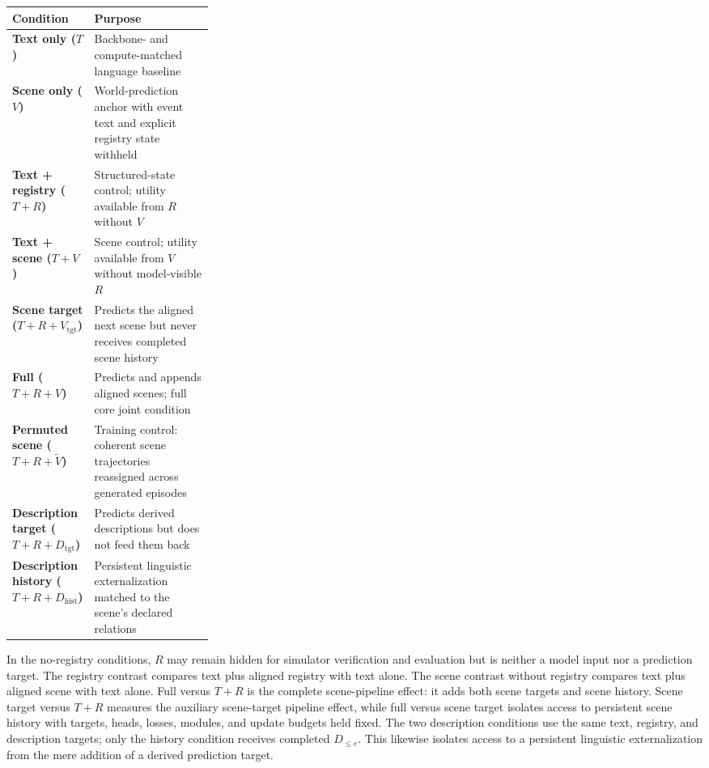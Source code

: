\documentclass[11pt]{article}
\begin{document}
\begin{center}
\small
\begin{tabularx}{0.97\linewidth}{@{}>{\bfseries}p{0.29\linewidth}X@{}}
\toprule
Condition & Purpose \\
\midrule
Text only ($T$) & Backbone- and compute-matched language baseline \\
Scene only ($V$) & World-prediction anchor with event text and explicit registry state withheld \\
Text + registry ($T+R$) & Structured-state control; utility available from $R$ without $V$ \\
Text + scene ($T+V$) & Scene control; utility available from $V$ without model-visible $R$ \\
Scene target ($T+R+V_{\mathrm{tgt}}$) & Predicts the aligned next scene but never receives completed scene history \\
Full ($T+R+V$) & Predicts and appends aligned scenes; full core joint condition \\
Permuted scene ($T+R+\widetilde V$) & Training control: coherent scene trajectories reassigned across generated episodes \\
Description target ($T+R+D_{\mathrm{tgt}}$) & Predicts derived descriptions but does not feed them back \\
Description history ($T+R+D_{\mathrm{hist}}$) & Persistent linguistic externalization matched to the scene's declared relations \\
\bottomrule
\end{tabularx}
\end{center}

In the no-registry conditions, $R$ may remain hidden for simulator verification and evaluation but is neither a model input nor a prediction target. The registry contrast compares text plus aligned registry with text alone. The scene contrast without registry compares text plus aligned scene with text alone. Full versus $T+R$ is the complete scene-pipeline effect: it adds both scene targets and scene history. Scene target versus $T+R$ measures the auxiliary scene-target pipeline effect, while full versus scene target isolates access to persistent scene history with targets, heads, losses, modules, and update budgets held fixed. The two description conditions use the same text, registry, and description targets; only the history condition receives completed $D_{\le e}$. This likewise isolates access to a persistent linguistic externalization from the mere addition of a derived prediction target.
\end{document}
